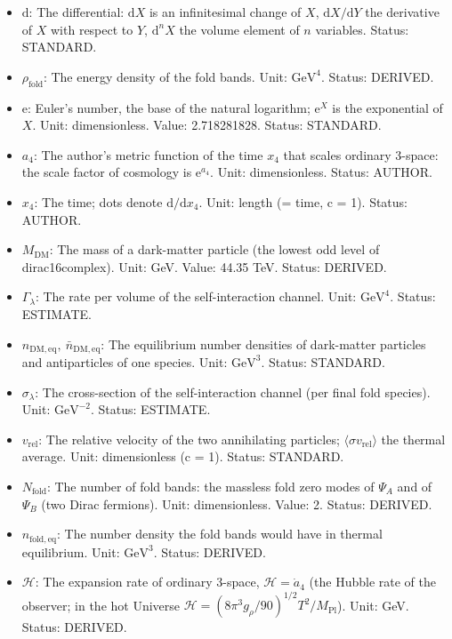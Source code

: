 \documentclass[
  10pt,
]{article}
\providecommand{\tightlist}{%
  \setlength{\itemsep}{0pt}\setlength{\parskip}{0pt}}
\begin{document}
\begin{itemize}
\tightlist
\item
  \(\mathrm{d}\): The differential: \(\mathrm{d}X\) is an infinitesimal
  change of \(X\), \(\mathrm{d}X/\mathrm{d}Y\) the derivative of \(X\)
  with respect to \(Y\), \(\mathrm{d}^nX\) the volume element of \(n\)
  variables. Status: STANDARD.
\item
  \(\rho_{\mathrm{fold}}\): The energy density of the fold bands. Unit:
  \(\mathrm{GeV}^{4}\). Status: DERIVED.
\item
  \(\mathrm{e}\): Euler's number, the base of the natural logarithm;
  \(\mathrm{e}^{X}\) is the exponential of \(X\). Unit: dimensionless.
  Value: 2.718281828. Status: STANDARD.
\item
  \(a_4\): The author's metric function of the time \(x_4\) that scales
  ordinary 3-space: the scale factor of cosmology is
  \(\mathrm{e}^{a_4}\). Unit: dimensionless. Status: AUTHOR.
\item
  \(x_4\): The time; dots denote \(\mathrm{d}/\mathrm{d}x_4\). Unit:
  length (= time, c = 1). Status: AUTHOR.
\item
  \(M_{\mathrm{DM}}\): The mass of a dark-matter particle (the lowest
  odd level of dirac16complex). Unit: GeV. Value: 44.35 TeV. Status:
  DERIVED.
\item
  \(\Gamma_\lambda\): The rate per volume of the self-interaction
  channel. Unit: \(\mathrm{GeV}^{4}\). Status: ESTIMATE.
\item
  \(n_{\mathrm{DM,eq}},\ \bar n_{\mathrm{DM,eq}}\): The equilibrium
  number densities of dark-matter particles and antiparticles of one
  species. Unit: \(\mathrm{GeV}^{3}\). Status: STANDARD.
\item
  \(\sigma_\lambda\): The cross-section of the self-interaction channel
  (per final fold species). Unit: \(\mathrm{GeV}^{-2}\). Status:
  ESTIMATE.
\item
  \(v_{\mathrm{rel}}\): The relative velocity of the two annihilating
  particles; \(\langle\sigma v_{\mathrm{rel}}\rangle\) the thermal
  average. Unit: dimensionless (c = 1). Status: STANDARD.
\item
  \(N_{\mathrm{fold}}\): The number of fold bands: the massless fold
  zero modes of \(\Psi_A\) and of \(\Psi_B\) (two Dirac fermions). Unit:
  dimensionless. Value: 2. Status: DERIVED.
\item
  \(n_{\mathrm{fold,eq}}\): The number density the fold bands would have
  in thermal equilibrium. Unit: \(\mathrm{GeV}^{3}\). Status: DERIVED.
\item
  \(\mathcal{H}\): The expansion rate of ordinary 3-space,
  \(\mathcal{H} = \dot a_4\) (the Hubble rate of the observer; in the
  hot Universe
  \(\mathcal{H} = (8\pi^3g_\rho/90)^{1/2}T^2/M_{\mathrm{Pl}}\)). Unit:
  GeV. Status: DERIVED.
\end{itemize}
\end{document}
